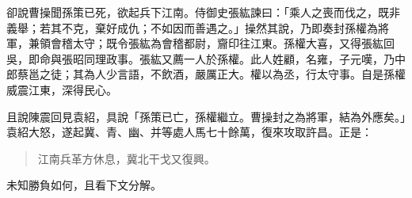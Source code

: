 卻說曹操聞孫策已死，欲起兵下江南。侍御史張紘諫曰：「乘人之喪而伐之，既非義舉；若其不克，棄好成仇；不如因而善遇之。」操然其說，乃即奏封孫權為將軍，兼領會稽太守；既令張紘為會稽都尉，齎印往江東。孫權大喜，又得張紘回吳，即命與張昭同理政事。張紘又薦一人於孫權。此人姓顧，名雍，子元嘆，乃中郎蔡邕之徒；其為人少言語，不飲酒，嚴厲正大。權以為丞，行太守事。自是孫權威震江東，深得民心。

且說陳震回見袁紹，具說「孫策已亡，孫權繼立。曹操封之為將軍，結為外應矣。」袁紹大怒，遂起冀、青、幽、并等處人馬七十餘萬，復來攻取許昌。正是：

\begin{quote}
江南兵革方休息，冀北干戈又復興。
\end{quote}

未知勝負如何，且看下文分解。
